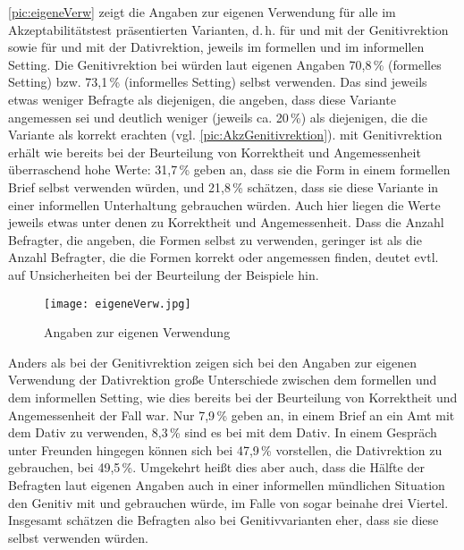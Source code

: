 \autoref{pic:eigeneVerw} zeigt die Angaben zur eigenen Verwendung für alle im Akzeptabilitätstest präsentierten Varianten, d.\,h. für \dank{} und \gegenueber{} mit der Genitivrektion sowie für \wegen{} und \waehrend{} mit der Dativrektion, jeweils im formellen und im informellen Setting. 
Die Genitivrektion bei \dank{} würden laut eigenen Angaben 70,8\,\% (formelles Setting) bzw. 73,1\,\% (informelles Setting) selbst verwenden. 
Das sind jeweils etwas weniger Befragte als diejenigen, die angeben, dass diese Variante angemessen sei und deutlich weniger (jeweils ca. 20\,\%) als diejenigen, die die Variante als korrekt erachten (vgl. \autoref{pic:AkzGenitivrektion}). 
 mit Genitivrektion erhält wie bereits bei der Beurteilung von Korrektheit und Angemessenheit überraschend hohe Werte: 
31,7\,\% geben an, dass sie die Form in einem formellen Brief selbst verwenden würden, und 21,8\,\% schätzen, dass sie diese Variante in einer informellen Unterhaltung gebrauchen würden. 
Auch hier liegen die Werte jeweils etwas unter denen zu Korrektheit und Angemessenheit. 
Dass die Anzahl Befragter, die angeben, die Formen selbst zu verwenden, geringer ist als die Anzahl Befragter, die die Formen korrekt oder angemessen finden, deutet evtl. auf Unsicherheiten bei der Beurteilung der Beispiele hin. 

\begin{figure}
\centering
\texttt{[image: eigeneVerw.jpg]}
\caption{Angaben zur eigenen Verwendung}
\label{pic:eigeneVerw}
\end{figure}

Anders als bei der Genitivrektion zeigen sich bei den Angaben zur eigenen Verwendung der Dativrektion große Unterschiede zwischen dem formellen und dem informellen Setting, wie dies bereits bei der Beurteilung von Korrektheit und Angemessenheit der Fall war. 
Nur 7,9\,\% geben an, in einem Brief an ein Amt \wegen{} mit dem Dativ zu verwenden, 8,3\,\% sind es bei \waehrend{} mit dem Dativ. 
In einem Gespräch unter Freunden hingegen können sich bei \wegen{} 47,9\,\% vorstellen, die Dativrektion zu gebrauchen, bei \waehrend{} 49,5\,\%. 
Umgekehrt heißt dies aber auch, dass die Hälfte der Befragten laut eigenen Angaben auch in einer informellen mündlichen Situation den Genitiv mit \wegen{} und \waehrend{} gebrauchen würde, im Falle von \dank{} sogar beinahe drei Viertel. 
Insgesamt schätzen die Befragten also bei Genitivvarianten eher, dass sie diese selbst verwenden würden.

